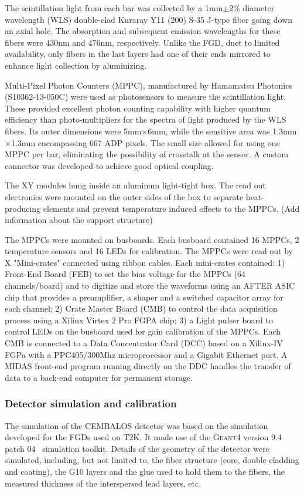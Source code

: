 The scintillation light from each bar was collected by a 1mm$\pm$2\% diameter wavelength (WLS) double-clad Kuraray Y11 (200) S-35 J-type fiber going down an axial hole. The absorption and subsequent emission wavelengths for these fibers were 430nm and 476nm, respectively. Unlike the FGD, duet to limited availability, only fibers in the last layers had one of their ends mirrored to enhance light collection by aluminizing.

Multi-Pixel Photon Counters (MPPC), manufactured by Hamamatsu Photonics (S10362-13-050C) were used as photosensors to measure the scintillation light. These provided excellent photon counting capability with higher quantum efficiency than photo-multipliers for the spectra of light produced by the WLS fibers. Its outer dimensions were 5mm$\times$6mm, while the sensitive area was 1.3mm$\times$1.3mm encompassing 667 ADP pixels. The small size allowed for using one MPPC per bar, eliminating the possibility of crosstalk at the sensor. A custom connector was developed to achieve good optical coupling.

The XY modules hung inside an aluminum light-tight box. The read out electronics were mounted on the outer sides of the box to separate heat-producing elements and prevent temperature induced effects to the MPPCs. (Add information about the support structure)

The MPPCs were mounted on busboards. Each busboard contained 16 MPPCs, 2 temperature sensors and 16 LEDs for calibration. The MPPCs were read out by X "Mini-crates" connected using ribbon cables. Each mini-crates contained: 1) Front-End Board (FEB) to set the bias voltage for the MPPCs (64 channels/board) and to digitize and store the waveforms using an AFTER ASIC chip that provides a preamplifier, a shaper and a switched capacitor array for each channel; 2) Crate Master Board (CMB) to control the data acquisition process using a Xilinx Virtex 2 Pro FGPA chip; 3) a Light pulser board to control LEDs on the busboard used for gain calibration of the MPPCs. Each CMB is connected to a Data Concentrator Card (DCC) based on a Xilinx-IV FGPa with a PPC405/300Mhz microprocessor and a Gigabit Ethernet port. A MIDAS \cite{midas} front-end program running directly on the DDC handles the transfer of data to a back-end computer for permanent storage. 

\subsubsection{\bf Detector simulation and calibration}\label{section:calibration}
The simulation of the CEMBALOS detector was based on the simulation developed for the FGDs used on T2K. It made use of the \textsc{Geant4} version 9.4 patch 04~\cite{geant} simulation toolkit. Details of the geometry of the detector were simulated, including, but not limited to, the fiber structure (core, double cladding and coating), the G10 layers and the glue used to hold them to the fibers, the measured thickness of the interspersed lead layers, etc. 

